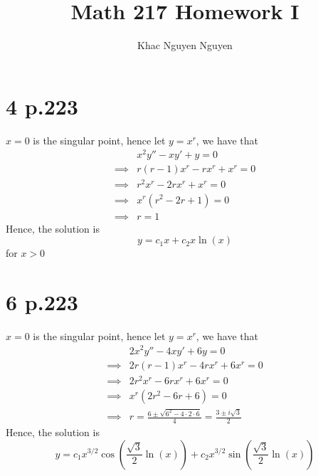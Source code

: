 \documentclass[11pt]{article}
\title{\textbf{Math 217 Homework I}}
\author{Khac Nguyen Nguyen}
\date{}
\begin{document}
\section*{4 p.223}
$x=0$ is the singular point, hence let $y = x^r$, we have that 
\begin{equation*}
    \begin{aligned}
        &x^2y'' -xy' + y = 0  \\
        \implies & r(r-1)x^r - rx^r + x^r = 0 \\
        \implies & r^2x^r - 2rx^r + x^r = 0 \\
        \implies & x^r(r^2-2r+1) = 0 \\
        \implies & r = 1
    \end{aligned}
\end{equation*}
Hence, the solution is 
\[
    y = c_1x + c_2x \ln(x)    
\]
for $x>0$
\newpage
\section*{6 p.223}
$x=0$ is the singular point, hence let $y = x^r$, we have that 
\begin{equation*}
    \begin{aligned}
        &2x^2y'' -4xy' + 6y = 0  \\
        \implies & 2r(r-1)x^r - 4rx^r + 6x^r = 0 \\
        \implies & 2r^2x^r - 6rx^r + 6x^r = 0 \\
        \implies & x^r(2r^2-6r+6) = 0 \\
        \implies &r = \frac{6 \pm \sqrt{6^2-4\cdot 2 \cdot 6}}{4} = \frac{3 \pm i\sqrt{3}}{2}
    \end{aligned}
\end{equation*}
Hence, the solution is 
\[
    y = c_1x^{3/2}\cos\left(\frac{\sqrt{3}}{2}\ln(x)\right) + c_2x^{3/2}\sin\left(\frac{\sqrt{3}}{2}\ln(x)\right)   
\]
\newpage
\end{document}
